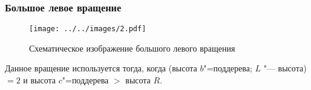 \begin{frame}
    \frametitle{Большое левое вращение}

    \begin{figure}[ht]
        \texttt{[image: ../../images/2.pdf]}

        \caption{Схематическое изображение большого левого вращения}
    \end{figure}

    Данное вращение используется тогда,
    когда (высота $b$"=поддерева; $L$ "--- высота)
    $= 2$ и высота $c$"=поддерева $>$ высота $R$.
\end{frame}